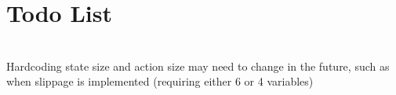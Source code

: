 \chapter{Todo List }
\hypertarget{todo}{}\label{todo}

\begin{DoxyRefList}
\item[{\parbox[t]{\linewidth}{Class \doxylink{classmpclib_1_1_drive_model}{mpclib::\+Drive\+Model} }}]\hfill \\
\label{todo__todo000001}%
%
 Hardcoding state size and action size may need to change in the future, such as when slippage is implemented (requiring either 6 or 4 variables)
\end{DoxyRefList}